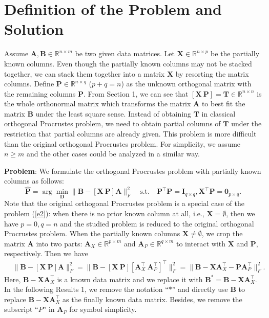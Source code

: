 \documentclass[titlepage,11pt,twoside]{article}
\let\oldemptyset\emptyset
\let\emptyset\varnothing
\begin{document}
\section{Definition of the Problem and Solution}
Assume $\mathbf{A},\mathbf{B}\in \mathbb{R}^{n\times m}$ be two given data matrices. Let $\mathbf{X}\in\mathbb{R}^{n\times p}$ be the partially known columns. Even though the partially known columns may not be stacked together, we can stack them together into a matrix $\mathbf{X}$ by resorting the matrix columns. Define $\mathbf{P}\in\mathbb{R}^{n\times q}$ ($p+q=n$) as the unknown orthogonal matrix with the remaining columns $\mathbf{P}$. From Section 1, we can see that $[\mathbf{X}\ \mathbf{P}]=\mathbf{T}\in\mathbb{R}^{n\times n}$ is the whole orthonormal matrix which transforms the matrix $\mathbf{A}$ to best fit the matrix $\mathbf{B}$ under the least square sense. Instead of obtaining $\mathbf{T}$ in classical orthogonal Procrustes problem, we need to obtain partial columns of $\mathbf{T}$ under the restriction that partial columns are already given. This problem is more difficult than the original orthogonal Procrustes problem. For simplicity, we assume $n\ge m$ and the other cases could be analyzed in a similar way. 

\textbf{Problem}: We formulate the orthogonal Procrustes problem with partially known columns as follows:
\begin{equation}\label{e2}
\mathbf{\hat{P}}=\arg\min_{\mathbf{D}}\|\mathbf{B}-[\mathbf{X}\ \mathbf{P}]\mathbf{A}\|_{F}^{2}
\quad
\text{s.t.}
\quad
\mathbf{P}^{\top}\mathbf{P} = \mathbf{I}_{q\times q}, \mathbf{X}^{\top}\mathbf{P} = \mathbf{0}_{p\times q}.
\end{equation} 
Note that the original orthogonal Procrustes problem is a special case of the problem (\ref{e2}): when there is no prior known column at all, i.e., $\mathbf{X}=\oldemptyset$, then we have $p=0,q=n$ and the studied problem is reduced to the original orthogonal Procrustes problem. 
When the partially known columns $\mathbf{X}\neq\oldemptyset$, we crop the matrix $\mathbf{A}$ into two parts: $\mathbf{A}_{X}\in\mathbb{R}^{p\times m}$ and $\mathbf{A}_{P}\in\mathbb{R}^{q\times m}$ to interact with $\mathbf{X}$ and $\mathbf{P}$, respectively. Then we have 
\begin{equation}
\begin{split}
&
\|\mathbf{B}-[\mathbf{X}\ \mathbf{P}]\mathbf{A}\|_{F}^{2}
=\|\mathbf{B}-[\mathbf{X}\ \mathbf{P}][\mathbf{A}_{X}^{\top}\ \mathbf{A}_{P}^{\top}]^{\top}\|_{F}^{2}
=\|\mathbf{B}-\mathbf{X}\mathbf{A}_{X}^{\top} - \mathbf{P}\mathbf{A}_{P}^{\top}\|_{F}^{2}.
\end{split}
\end{equation}
Here, $\mathbf{B}-\mathbf{X}\mathbf{A}_{X}^{\top}$ is a known data matrix and we replace it with 
$\mathbf{B}^{*}=\mathbf{B}-\mathbf{X}\mathbf{A}_{X}^{\top}$. In the following Results 1, we remove the notation ``$*$'' and directly use $\mathbf{B}$ to replace $\mathbf{B}-\mathbf{X}\mathbf{A}_{X}^{\top}$ as the finally known data matrix. Besides, we remove the subscript ``$P$'' in $\mathbf{A}_{P}$ for symbol simplicity.
\end{document}
